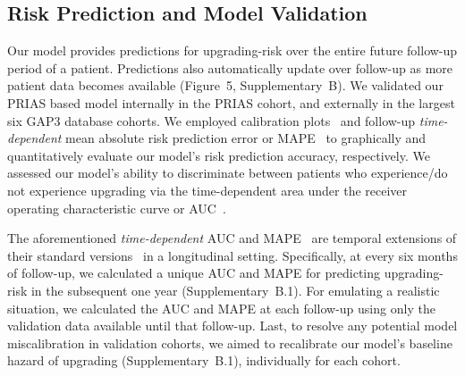 \subsection{Risk Prediction and Model Validation}
Our model provides predictions for upgrading-risk over the entire future follow-up period of a patient. Predictions also automatically update over follow-up as more patient data becomes available (Figure~5, Supplementary~B). We validated our PRIAS based model internally in the PRIAS cohort, and externally in the largest six GAP3 database cohorts. We employed calibration plots~\citep{royston2013external,steyerberg2010assessing} and follow-up \textit{time-dependent} mean absolute risk prediction error or MAPE~\citep{rizopoulos2017dynamic} to graphically and quantitatively evaluate our model's risk prediction accuracy, respectively. We assessed our model's ability to discriminate between patients who experience/do not experience upgrading via the time-dependent area under the receiver operating characteristic curve or AUC~\citep{rizopoulos2017dynamic}. 

The aforementioned \textit{time-dependent} AUC and MAPE~\citep{rizopoulos2017dynamic} are temporal extensions of their standard versions~\citep{steyerberg2010assessing} in a longitudinal setting. Specifically, at every six months of follow-up, we calculated a unique AUC and MAPE for predicting upgrading-risk in the subsequent one year (Supplementary~B.1). For emulating a realistic situation, we calculated the AUC and MAPE at each follow-up using only the validation data available until that follow-up. Last, to resolve any potential model miscalibration in validation cohorts, we aimed to recalibrate our model's baseline hazard of upgrading (Supplementary~B.1), individually for each cohort.